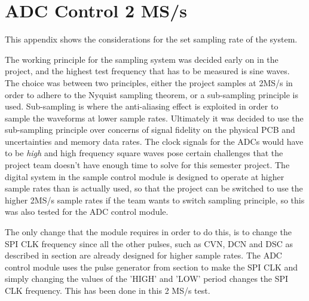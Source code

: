 \chapter{ADC Control 2 MS/s} \label{App:HSADCControlTest}
This appendix shows the considerations for the set sampling rate of the system.

The working principle for the sampling system was decided early on in the project, and the highest test frequency that has to be measured is  sine waves. The choice was between two principles, either the project samples at 2MS/s in order to adhere to the Nyquist sampling theorem, or a sub-sampling principle is used. Sub-sampling is where the anti-aliasing effect is exploited in order to sample the waveforms at lower sample rates. Ultimately it was decided to use the sub-sampling principle over concerns of signal fidelity on the physical PCB and uncertainties and memory data rates. The clock signals for the ADCs would have to be \textit{high} and high frequency square waves pose certain challenges that the project team doesn't have enough time to solve for this semester project. The digital system in the sample control module is designed to operate at higher sample rates than is actually used, so that the project can be switched to use the higher 2MS/s sample rates if the team wants to switch sampling principle, so this was also tested for the ADC control module.

The only change that the module requires in order to do this, is to change the SPI CLK frequency since all the other pulses, such as CVN, DCN and DSC as described in section  are already designed for higher sample rates. The ADC control module uses the pulse generator from section  to make the SPI CLK and simply changing the values of the 'HIGH' and 'LOW' period changes the SPI CLK frequency. This has been done in this 2 MS/s test.

